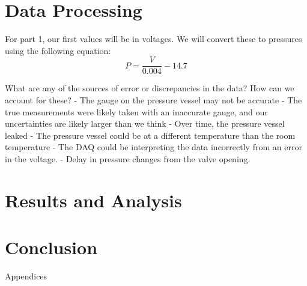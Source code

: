 \documentclass{article}
\begin{document}
\section{Data Processing}

For part 1, our first values will be in voltages. We will convert these to pressures using the following equation:
\[
P = \frac{V}{0.004} - 14.7
\]

What are any of the sources of error or discrepancies in the data? How can we account for these?
- The gauge on the pressure vessel may not be accurate
- The true measurements were likely taken with an inaccurate gauge, and our uncertainties are likely larger than we think
- Over time, the pressure vessel leaked
- The pressure vessel could be at a different temperature than the room temperature
- The DAQ could be interpreting the data incorrectly from an error in the voltage.
- Delay in pressure changes from the valve opening.


\section{Results and Analysis}

\section{Conclusion}

\newpage
\thispagestyle{empty}  %
\begin{center}
	\vspace*{\fill}
	{\Huge Appendices}
	\vspace*{\fill}
\end{center}
\end{document}
